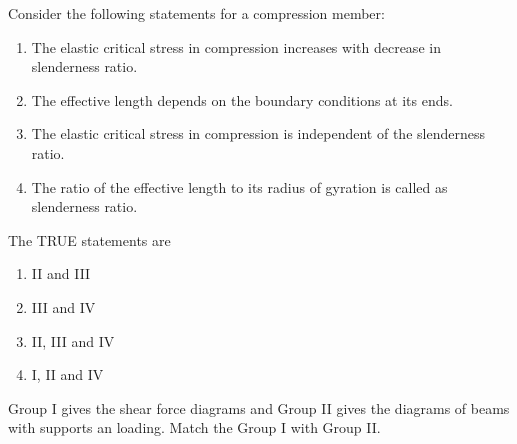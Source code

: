 \item Consider the following statements for a compression member:
\begin{enumerate}
    \item The elastic critical stress in compression increases with decrease in slenderness ratio.
    \item The effective length depends on the boundary conditions at its ends.
    \item The elastic critical stress in compression is independent of the slenderness ratio.
    \item The ratio of the effective length to its radius of gyration is called as slenderness ratio.
\end{enumerate}

The TRUE statements are
\begin{enumerate}
    \item II and III
    \item III and IV
    \item II, III and IV
    \item I, II and IV
\end{enumerate}
\item Group I gives the shear force diagrams and Group II gives the diagrams of beams with supports an loading. Match the Group I with Group II.
